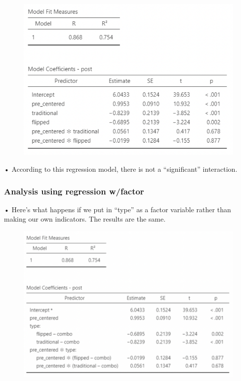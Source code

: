\documentclass[
  letterpaper,
  DIV=11,
  numbers=noendperiod]{scrreprt}
\begin{document}
\begin{figure}

{\centering \includegraphics[width=5.30208in,height=\textheight]{images/Mod5_24.png}

}

\end{figure}

• According to this regression model, there is not a ``significant''
interaction.

\hypertarget{analysis-using-regression-wfactor}{%
\subsubsection{Analysis using regression
w/factor}\label{analysis-using-regression-wfactor}}

• Here's what happens if we put in ``type'' as a factor variable rather
than making our own indicators. The results are the same.

\begin{figure}

{\centering \includegraphics[width=5.3125in,height=\textheight]{images/Mod5_25.png}

}

\end{figure}
\end{document}
